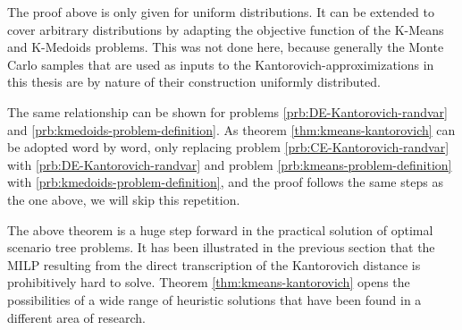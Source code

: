 \begin{Note}
  The proof above is only given for uniform distributions.
  It can be extended to cover arbitrary distributions by adapting the objective function of the K-Means and K-Medoids problems.
  This was not done here, because generally the Monte Carlo samples that are used as inputs to the Kantorovich-approximizations in this thesis are by nature of their construction uniformly distributed.
\end{Note}
The same relationship can be shown for problems \ref{prb:DE-Kantorovich-randvar} and \ref{prb:kmedoids-problem-definition}.
As theorem \ref{thm:kmeans-kantorovich} can be adopted word by word, only replacing problem \ref{prb:CE-Kantorovich-randvar} with \ref{prb:DE-Kantorovich-randvar} and problem \ref{prb:kmeans-problem-definition} with \ref{prb:kmedoids-problem-definition}, and the proof follows the same steps as the one above, we will skip this repetition.

The above theorem is a huge step forward in the practical solution of optimal scenario tree problems.
It has been illustrated in the previous section that the MILP resulting from the direct transcription of the Kantorovich distance is prohibitively hard to solve.
Theorem \ref{thm:kmeans-kantorovich} opens the possibilities of a wide range of heuristic solutions that have been found in a different area of research.

